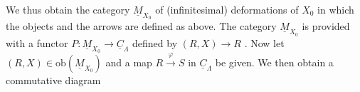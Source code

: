 \begin{center}
\end{center}
We thus obtain the category $\underline{M}_{X_0}$ of (infinitesimal) deformations of $X_0$ in which the objects and the arrows are defined as above. The category $\underline{M}_{X_0}$ is provided with a functor $P : \underline{M}_{X_0} \to \underline{C}_\Lambda$ defined by $(R, X) \to R$ . Now let $(R, X) \in \mathrm{ob}(\underline{M}_{X_0})$ and a map $R \xrightarrow{\ \varphi\ } S$ in $\underline{C}_\Lambda$ be given. We then obtain a commutative diagram

